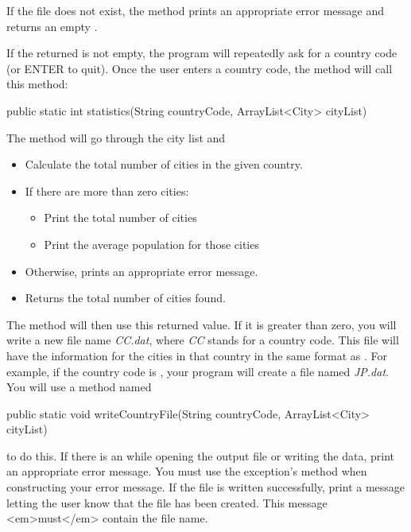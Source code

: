\begin{exercise}
If the file does not exist, the method prints an appropriate error message and returns an empty .

If the returned  is not empty, the program will repeatedly ask for a country code (or ENTER to quit).
Once the user enters a country code, the  method will call this method:

\begin{stdout}
public static int statistics(String countryCode,
   ArrayList<City> cityList)
\end{stdout}

The  method will go through the city list and

\begin{itemize}
    \item Calculate the total number of cities in the given country.
    \item If there are more than zero cities:
        \begin{itemize}
            \item Print the total number of cities
            \item Print the average population for those cities
        \end{itemize}
    
    \item Otherwise, prints an appropriate error message.
    \item Returns the total number of cities found.
\end{itemize}

The  method will then use this returned value. If it is greater than zero, you will write a new file name {\em CC.dat}, where {\em CC} stands for a country code. This file will have the information for the cities in that country in the same format as . For example, if the country code is , your program will create a file named {\em JP.dat}. You will use a method named

\begin{stdout}
public static void writeCountryFile(String countryCode,
    ArrayList<City> cityList)
\end{stdout}

to do this. If there is an  while opening the output file or writing the data, print an appropriate error message. You must use the exception's  method when constructing your error message. If the file is written successfully, print a message letting the user know that the file has been created. This message <em>must</em> contain the file name.


\end{exercise}
